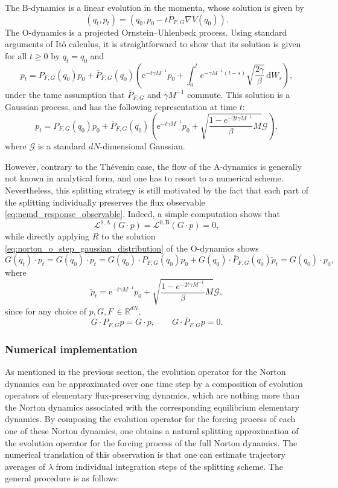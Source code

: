 \documentclass[pdflatex,sn-mathphys]{sn-jnl}%
\theoremstyle{thmstyleone}%
\theoremstyle{thmstyletwo}%
\theoremstyle{thmstylethree}%
\renewcommand{\d}{\mathrm{d}}
\newcommand{\cL}{\mathcal{L}}
\newcommand{\1}{\mathbbm{1}}
\renewcommand{\e}{\mathrm{e}}
\renewcommand{\R}{\mathbb{R}}
\begin{document}
The $\mathrm{B}$-dynamics is a linear evolution in the momenta, whose solution is given by
\[(q_t,p_t)=\left(q_0, p_0 - t \overline{P}_{F,G}\nabla V(q_0)\right).\]
The $\mathrm{O}$-dynamics is a projected Ornstein--Uhlenbeck process. Using standard arguments of It\^o calculus, it is straightforward to show that its solution is given for all $t\geq 0$ by $q_t=q_0$ and
\[p_t = {P}_{F,G}(q_0)p_0 +\overline{P}_{F,G}(q_0)\left(\e^{-t\gamma M^{-1}}p_0 +\int_0^t e^{-\gamma M^{-1}(t-s)}\sqrt{\frac{2\gamma}{\beta}}\,\d W_s\right),\]
under the tame assumption that $\overline{P}_{F,G}$ and $\gamma M^{-1}$ commute.
This solution is a Gaussian process, and has the following representation at time $t$:
\begin{equation}
\label{eq:norton_o_step_gaussian_distribution}
p_t = {P}_{F,G}(q_0)p_0 + \overline{P}_{F,G}(q_0)\left(\e^{-t\gamma M^{-1}}p_0 +\sqrt{\frac{1-e^{-2t\gamma M^{-1}}}{\beta}M}\mathcal{G}\right),
\end{equation}
where $\mathcal{G}$ is a standard $dN$-dimensional Gaussian.

However, contrary to the Th\'evenin case, the flow of the $\mathrm{A}$-dynamics is generally not known in analytical form, and one has to resort to a numerical scheme. Nevertheless, this splitting strategy is still motivated by the fact that each part of the splitting individually preserves the flux observable \eqref{eq:nemd_response_observable}. Indeed, a simple computation shows that 
\[ \cL^{0,\mathrm{A}} \left(G\cdot p\right) = \cL^{0,\mathrm{B}} \left( G\cdot p\right) = 0,\]
while directly applying $R$ to the solution \eqref{eq:norton_o_step_gaussian_distribution} of the $\mathrm{O}$-dynamics shows
\[G(q_t)\cdot p_t=G(q_0)\cdot p_t = G(q_0)\cdot P_{F,G}(q_0)p_0 + G(q_0)\cdot \overline{P}_{F,G}(q_0)\widetilde{p}_t = G(q_0)\cdot p_0,\]
where \[\widetilde{p}_t = \e^{-t\gamma M^{-1}}p_0 +\sqrt{\frac{1-e^{-2t\gamma M^{-1}}}{\beta}M}\mathcal{G},\]
since for any choice of $p,G,F\,\in \R^{dN},$
\[G\cdot P_{F,G} p = G\cdot p,\qquad G\cdot \overline{P}_{F,G}p = 0.\]

\subsubsection{Numerical implementation}
As mentioned in the previous section, the evolution operator for the Norton dynamics can be approximated over one time step by a composition of evolution operators of elementary flux-preserving dynamics, which are nothing more than the Norton dynamics associated with the corresponding equilibrium elementary dynamics. By composing the evolution operator for the forcing process of each one of these Norton dynamics, one obtains a natural splitting approximation of the evolution operator for the forcing process of the full Norton dynamics. The numerical translation of this observation is that one can estimate trajectory averages of $\lambda$ from individual integration steps of the splitting scheme. The general procedure is as follows:
\end{document}
